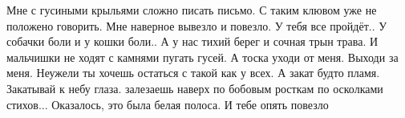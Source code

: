 \begin{itemize}
Мне с гусиными крыльями сложно писать письмо. С таким клювом уже не положено
говорить. Мне наверное вывезло и повезло. У тебя все пройдёт.. У собачки боли и
у кошки боли.. А у нас тихий берег и сочная трын трава. И мальчишки не ходят с
камнями пугать гусей. А тоска уходи от меня. Выходи за меня. Неужели ты хочешь
остаться с такой как у всех. А закат будто пламя. Закатывай к небу глаза.
залезаешь наверх по бобовым росткам по осколками стихов... Оказалось, это была
белая полоса. И тебе опять повезло
\end{itemize}

